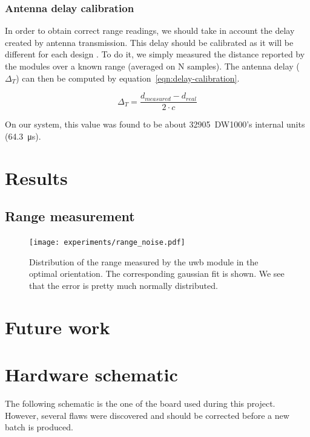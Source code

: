 \documentclass[a4paper, 12pt]{scrreprt}
\begin{document}
\subsection{Antenna delay calibration}
In order to obtain correct range readings, we should take in account the delay created by antenna transmission.
This delay should be calibrated as it will be different for each design \cite{dw1000manual}.
To do it, we simply measured the distance reported by the modules over a known range (averaged on N samples).
The antenna delay ($\Delta_T$) can then be computed by equation~\ref{eqn:delay-calibration}.

\begin{equation}
    \Delta_T = \frac{d_{measured} - d_{real}}{2\cdot c}
    \label{eqn:delay-calibration}
\end{equation}

On our system, this value was found to be about 32905~DW1000's internal units (\SI{64.3}{\micro\second}).

\chapter{Results}

\section{Range measurement}
\label{sec:range_result}


\begin{figure}[h]
    \centering
    \texttt{[image: experiments/range\_noise.pdf]}
    \caption{Distribution of the range measured by the \gls{uwb} module in the optimal orientation.
        The corresponding gaussian fit is shown.
        We see that the error is pretty much normally distributed.
    }
    \label{fig:range_noise}
\end{figure}


\chapter{Future work}
\appendix
\chapter{Hardware schematic}

The following schematic is the one of the board used during this project.
However, several flaws were discovered and should be corrected before a new batch is produced.
\end{document}

